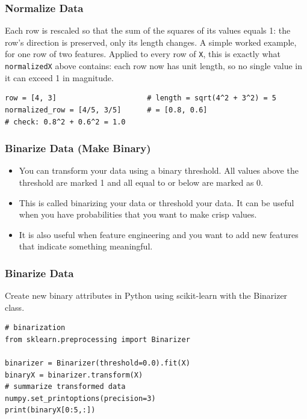 \begin{frame}[fragile]\frametitle{Normalize Data}
Each row is rescaled so that the sum of the squares of its values equals 1: the row's direction is preserved, only its length changes. A simple worked example, for one row of two features. Applied to every row of \texttt{X}, this is exactly what \texttt{normalizedX} above contains: each row now has unit length, so no single value in it can exceed 1 in magnitude.
\begin{lstlisting}
row = [4, 3]                     # length = sqrt(4^2 + 3^2) = 5
normalized_row = [4/5, 3/5]      # = [0.8, 0.6]
# check: 0.8^2 + 0.6^2 = 1.0
\end{lstlisting}
\end{frame}



\begin{frame}[fragile]\frametitle{Binarize Data (Make Binary)}

	\begin{itemize}
	\item You can transform your data using a binary threshold. All values above the threshold are marked 1 and all equal to or below are marked as 0.
	\item This is called binarizing your data or threshold your data. It can be useful when you have probabilities that you want to make crisp values. 
	\item It is also useful when feature engineering and you want to add new features that indicate something meaningful.
	\end{itemize}
	
\end{frame}

\begin{frame}[fragile]\frametitle{Binarize Data}
Create new binary attributes in Python using scikit-learn with the Binarizer class.
\begin{lstlisting}
# binarization
from sklearn.preprocessing import Binarizer

binarizer = Binarizer(threshold=0.0).fit(X)
binaryX = binarizer.transform(X)
# summarize transformed data
numpy.set_printoptions(precision=3)
print(binaryX[0:5,:])
\end{lstlisting}
\end{frame}

